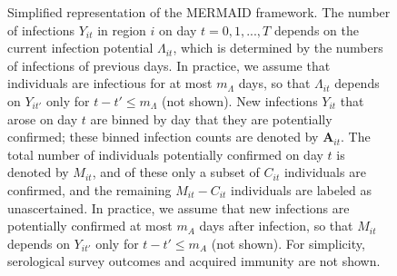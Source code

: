 \documentclass{article}
\begin{document}
\begin{figure}

\centering


\caption{Simplified representation of the MERMAID framework. The number of infections $Y_{it}$ in region $i$ on day $t= 0, 1, ..., T$ depends on the current infection potential $\Lambda_{it}$, which is determined by the numbers of infections of previous days.  In practice, we assume that individuals are infectious for at most $m_{\Lambda}$ days, so that $\Lambda_{it}$ depends on $Y_{it'}$ only for $t-t' \leq m_{\Lambda}$ (not shown). New infections $Y_{it}$ that arose on day $t$ are binned by day that they are potentially confirmed; these binned infection counts are denoted by $\bm{A}_{it}$. The total number of individuals potentially confirmed on day $t$ is denoted by $M_{it}$, and of these only a subset of $C_{it}$ individuals are confirmed, and the remaining $M_{it}-C_{it}$ individuals are labeled as unascertained.  In practice, we assume that new infections are potentially confirmed at most $m_{A}$ days after infection, so that $M_{it}$ depends on $Y_{it'}$ only for $t-t' \leq m_{A}$ (not shown). For simplicity, serological survey outcomes and acquired immunity are not shown.}

\end{figure}
\end{document}
